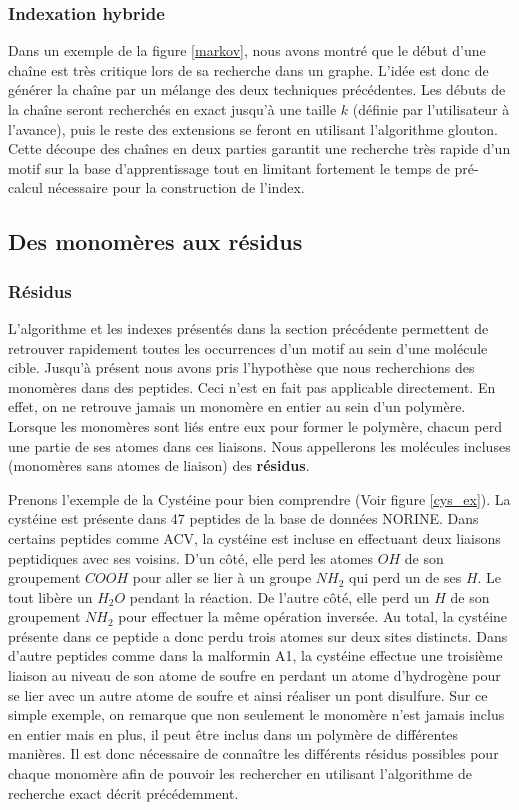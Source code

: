 \subsubsection{Indexation hybride}

Dans un exemple de la figure \ref{markov}, nous avons montré que le début d'une chaîne est très critique lors de sa recherche dans un graphe.
L'idée est donc de générer la chaîne par un mélange des deux techniques précédentes.
Les débuts de la chaîne seront recherchés en exact jusqu'à une taille $k$ (définie par l'utilisateur à l'avance), puis le reste des extensions se feront en utilisant l'algorithme glouton.
Cette découpe des chaînes en deux parties garantit une recherche très rapide d'un motif sur la base d'apprentissage tout en limitant fortement le temps de pré-calcul nécessaire pour la construction de l'index.



\subsection{Des monomères aux résidus}
\label{families}


\subsubsection{Résidus}

L'algorithme et les indexes présentés dans la section précédente permettent de retrouver rapidement toutes les occurrences d'un motif au sein d'une molécule cible.
Jusqu'à présent nous avons pris l'hypothèse que nous recherchions des monomères dans des peptides.
Ceci n'est en fait pas applicable directement.
En effet, on ne retrouve jamais un monomère en entier au sein d'un polymère.
Lorsque les monomères sont liés entre eux pour former le polymère, chacun perd une partie de ses atomes dans ces liaisons.
Nous appellerons les molécules incluses (monomères sans atomes de liaison) des \textbf{résidus}.

Prenons l'exemple de la Cystéine pour bien comprendre (Voir figure \ref{cys_ex}).
La cystéine est présente dans 47 peptides de la base de données NORINE.
Dans certains peptides comme ACV, la cystéine est incluse en effectuant deux liaisons peptidiques avec ses voisins.
D'un côté, elle perd les atomes $OH$ de son groupement $COOH$ pour aller se lier à un groupe $NH_2$ qui perd un de ses $H$. 
Le tout libère un $H_2O$ pendant la réaction.
De l'autre côté, elle perd un $H$ de son groupement $NH_2$ pour effectuer la même opération inversée.
Au total, la cystéine présente dans ce peptide a donc perdu trois atomes sur deux sites distincts.
Dans d'autre peptides comme dans la malformin A1, la cystéine effectue une troisième liaison au niveau de son atome de soufre en perdant un atome d'hydrogène pour se lier avec un autre atome de soufre et ainsi réaliser un pont disulfure.
Sur ce simple exemple, on remarque que non seulement le monomère n'est jamais inclus en entier mais en plus, il peut être inclus dans un polymère de différentes manières.
Il est donc nécessaire de connaître les différents résidus possibles pour chaque monomère afin de pouvoir les rechercher en utilisant l'algorithme de recherche exact décrit précédemment.

